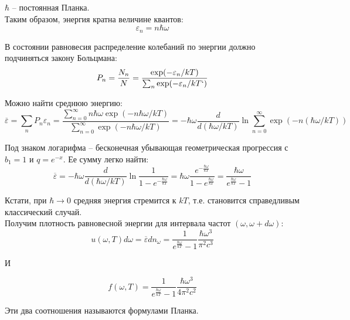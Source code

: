 \documentclass{article}
\begin{document}
	$\hbar$ -- постоянная Планка.\\

	Таким образом, энергия кратна величине квантов:
	\begin{equation}
		\varepsilon_n = n\hbar\omega
	\end{equation}

	В состоянии равновесия распределение колебаний по энергии должно подчиняться закону Больцмана:
	\begin{equation}
		P_n = \frac{N_n}{N}=\frac{\exp(-\varepsilon_n/kT)}{\sum_n \exp(-\varepsilon_n/kT`)}
	\end{equation}

	Можно найти среднюю энергию:
	\begin{equation}
		\overline \varepsilon = \sum_n P_n\varepsilon_n=\frac{\sum_{n=0}^\infty n\hbar\omega\exp(-n\hbar\omega/kT)}{\sum_{n=0}^\infty \exp(-n\hbar\omega/kT)} = -\hbar\omega \frac{d}{d(\hbar\omega/kT)} \ln\sum_{n=0}^\infty \exp(-n(\hbar\omega/kT))
	\end{equation}

	Под знаком логарифма -- бесконечная убывающая геометрическая прогрессия с $b_1=1$ и $q=e^{-x}$. Ее сумму легко найти:
	\begin{equation}
		\overline\varepsilon = -\hbar\omega\frac{d}{d(\hbar\omega/kT)}\ln\frac{1}{1-e^{-\frac{\hbar\omega}{kT}}} = \hbar\omega\frac{e^{-\frac{\hbar\omega}{kT}}}{1-e^\frac{\hbar\omega}{kT}} = \frac{\hbar\omega}{e^{\frac{\hbar\omega}{kT}}-1}
	\end{equation}

	Кстати, при $\hbar\rightarrow 0$ средняя энергия стремится к $kT$, т.е. становится справедливым классический случай.\\

	Получим плотность равновесной энергии для интервала частот $(\omega,\omega+d\omega)$:
	\begin{equation}
		u(\omega,T)d\omega = \overline\varepsilon dn_\omega = \frac{1}{e^{\frac{\hbar\omega}{kT}} - 1} \frac{\hbar\omega^3}{\pi^2 c^3}
	\end{equation}

	И

	\begin{equation}
		f(\omega,T) = \frac{1}{e^{\frac{\hbar\omega}{kT}} - 1} \frac{\hbar\omega^3}{4\pi^2 c^2}
	\end{equation}

	Эти два соотношения называются формулами Планка.\\
\end{document}
